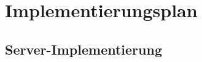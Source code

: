 \section{Implementierungsplan}

\def\pgfcalendarweekdayletter#1{%
	\ifcase#1M\or D\or M\or D\or F\or S\or S\fi%
}  
\def\pgfcalendarmonthname#1{%
	\ifcase#1 Dezember \or Januar\or Februar\or März\or April\or Mai\or Juni\or Juli \or August \or S. \or Oktober \or November \or Dezember\fi%
}  


\subsection{Server-Implementierung}



	